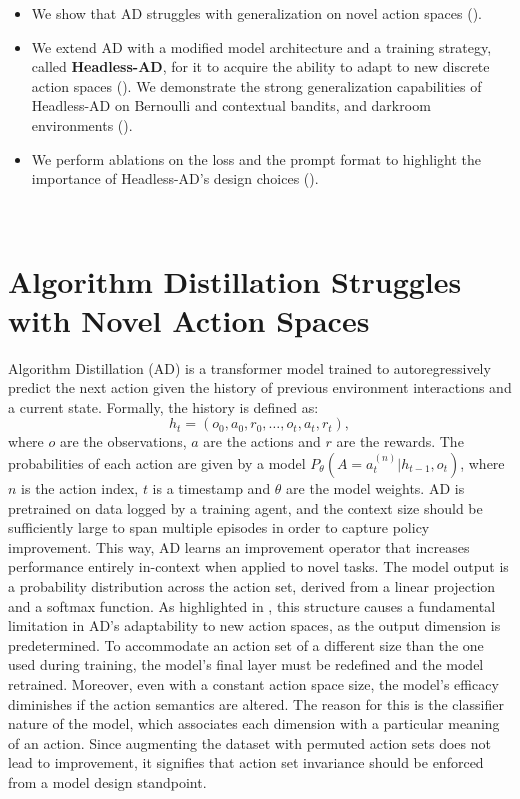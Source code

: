 \documentclass{article}
\theoremstyle{plain}
\theoremstyle{definition}
\theoremstyle{remark}
\begin{document}
\begin{itemize}
    \item We show that AD struggles with generalization on novel action spaces ().
    \item We extend AD with a modified model architecture and a training strategy, called \textbf{Headless-AD}, for it to acquire the ability to adapt to new discrete action spaces (). We demonstrate the strong generalization capabilities of Headless-AD on Bernoulli and contextual bandits, and darkroom environments ().
    \item We perform ablations on the loss and the prompt format to highlight the importance of Headless-AD's design choices ().
\end{itemize}
\vphantom{loh}\\
\section{Algorithm Distillation Struggles with Novel Action Spaces}
\label{section:ad_struggles}
Algorithm Distillation (AD) \citep{laskin2022context} is a transformer model trained to autoregressively predict the next action given the history of previous environment interactions and a current state. Formally, the history is defined as:
\[
h_t = \left(o_0, a_0, r_0, \dots, o_t, a_t, r_t\right),
\]
where $o$ are the observations, $a$ are the actions and $r$ are the rewards. The probabilities of each action are given by a model $P_\theta(A=a^{(n)}_t|h_{t-1}, o_t)$, where $n$ is the action index, $t$ is a timestamp and $\theta$ are the model weights.
AD is pretrained on data logged by a training agent, and the context size should be sufficiently large to span multiple episodes in order to capture policy improvement. This way, AD learns an improvement operator that increases performance entirely in-context when applied to novel tasks.
The model output is a probability distribution across the action set, derived from a linear projection and a softmax function. As highlighted in , this structure causes a fundamental limitation in AD's adaptability to new action spaces, as the output dimension is predetermined. To accommodate an action set of a different size than the one used during training, the model's final layer must be redefined and the model retrained. Moreover, even with a constant action space size, the model's efficacy diminishes if the action semantics are altered. The reason for this is the classifier nature of the model, which associates each dimension with a particular meaning of an action. Since augmenting the dataset with permuted action sets does not lead to improvement, it signifies that action set invariance should be enforced from a model design standpoint.
\end{document}

